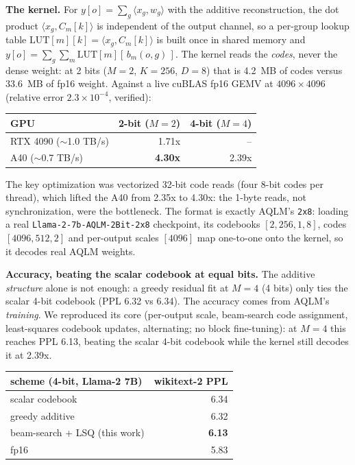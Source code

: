 \documentclass[11pt]{article}
\begin{document}
\textbf{The kernel.} For $y[o] = \sum_g \langle x_g, w_g \rangle$ with the additive
reconstruction, the dot product $\langle x_g, C_m[k] \rangle$ is independent of the output
channel, so a per-group lookup table $\mathrm{LUT}[m][k] = \langle x_g, C_m[k] \rangle$ is
built once in shared memory and $y[o] = \sum_g \sum_m \mathrm{LUT}[m][\,b_m(o,g)\,]$. The
kernel reads the \emph{codes}, never the dense weight: at 2 bits ($M=2$, $K=256$, $D=8$)
that is 4.2~MB of codes versus 33.6~MB of fp16 weight. Against a live cuBLAS fp16
GEMV at $4096 \times 4096$ (relative error $2.3 \times 10^{-4}$, verified):

\begin{center}
\begin{tabular}{lrr}
\toprule
GPU & 2-bit ($M=2$) & 4-bit ($M=4$) \\
\midrule
RTX 4090 ($\sim$1.0 TB/s) & 1.71x & -- \\
A40 ($\sim$0.7 TB/s)      & \textbf{4.30x} & 2.39x \\
\bottomrule
\end{tabular}
\end{center}

The key optimization was vectorized 32-bit code reads (four 8-bit codes per thread), which
lifted the A40 from 2.35x to 4.30x: the 1-byte reads, not synchronization, were the
bottleneck. The format is exactly AQLM's \texttt{2x8}: loading a real
\texttt{Llama-2-7b-AQLM-2Bit-2x8} checkpoint, its codebooks $[2,256,1,8]$, codes
$[4096,512,2]$ and per-output scales $[4096]$ map one-to-one onto the kernel, so it decodes
real AQLM weights.

\textbf{Accuracy, beating the scalar codebook at equal bits.} The additive \emph{structure}
alone is not enough: a greedy residual fit at $M=4$ (4 bits) only ties the scalar 4-bit
codebook (PPL 6.32 vs 6.34). The accuracy comes from AQLM's \emph{training}. We reproduced
its core (per-output scale, beam-search code assignment, least-squares codebook updates,
alternating; no block fine-tuning): at $M=4$ this reaches PPL 6.13, beating the scalar
4-bit codebook while the kernel still decodes it at 2.39x.

\begin{center}
\begin{tabular}{lr}
\toprule
scheme (4-bit, Llama-2 7B) & wikitext-2 PPL \\
\midrule
scalar codebook                 & 6.34 \\
greedy additive                 & 6.32 \\
beam-search + LSQ (this work)   & \textbf{6.13} \\
fp16                            & 5.83 \\
\bottomrule
\end{tabular}
\end{center}
\end{document}

